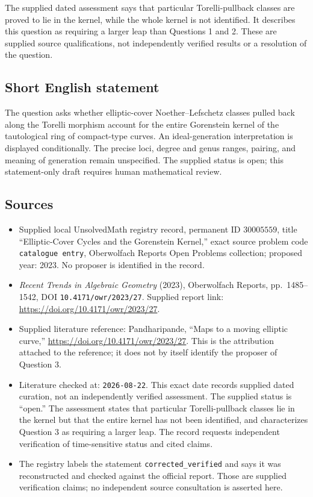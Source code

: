 \documentclass[11pt]{article}
\begin{document}
The supplied dated assessment says that particular Torelli-pullback classes are proved to lie in the kernel, while the whole kernel is not identified. It describes this question as requiring a larger leap than Questions 1 and 2. These are supplied source qualifications, not independently verified results or a resolution of the question.
\subsection{Short English statement}
The question asks whether elliptic-cover Noether--Lefschetz classes pulled back along the Torelli morphism account for the entire Gorenstein kernel of the tautological ring of compact-type curves. An ideal-generation interpretation is displayed conditionally. The precise loci, degree and genus ranges, pairing, and meaning of generation remain unspecified. The supplied status is open; this statement-only draft requires human mathematical review.
\subsection{Sources}
\begin{itemize}
\item Supplied local UnsolvedMath registry record, permanent ID \(30005559\), title ``Elliptic-Cover Cycles and the Gorenstein Kernel,'' exact source problem code \texttt{catalogue entry}, Oberwolfach Reports Open Problems collection; proposed year: 2023. No proposer is identified in the record.
\item \emph{Recent Trends in Algebraic Geometry} (2023), Oberwolfach Reports, pp.~1485--1542, DOI \texttt{10.4171/owr/2023/27}. Supplied report link: \url{https://doi.org/10.4171/owr/2023/27}.
\item Supplied literature reference: Pandharipande, ``Maps to a moving elliptic curve,'' \url{https://doi.org/10.4171/owr/2023/27}. This is the attribution attached to the reference; it does not by itself identify the proposer of Question 3.
\item Literature checked at: \texttt{2026-08-22}. This exact date records supplied dated curation, not an independently verified assessment. The supplied status is ``open.'' The assessment states that particular Torelli-pullback classes lie in the kernel but that the entire kernel has not been identified, and characterizes Question 3 as requiring a larger leap. The record requests independent verification of time-sensitive status and cited claims.
\item The registry labels the statement \texttt{corrected\_verified} and says it was reconstructed and checked against the official report. Those are supplied verification claims; no independent source consultation is asserted here.
\end{itemize}
\end{document}
